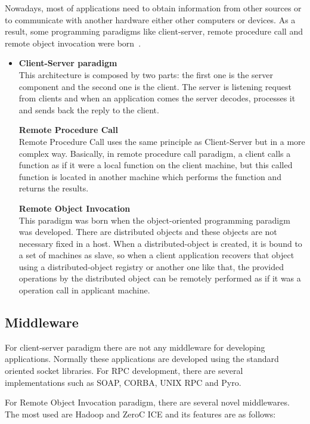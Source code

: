 Nowadays, most of applications need to obtain information from other sources
or to communicate with another hardware either other computers or
devices. As a
result, some programming paradigms like client-server, remote procedure call and
remote object invocation were born~\cite{Tanenbaum2008}.
\begin{itemize}
\item \textbf{Client-Server paradigm}~\\
This architecture is composed by two parts: the first one is the server
component and the second one is the client. The server is listening request from
clients and when an application comes the server decodes, processes it and
sends back the reply to the client.

\textbf{Remote Procedure Call}~\\
Remote Procedure Call uses the same principle as Client-Server but in a more
complex way. Basically, in remote procedure call paradigm, a client calls a
function as if it were a local function on the client machine, but this called
function is located in another machine which performs the function and returns
the results.

\textbf{Remote Object Invocation}~\\
This paradigm was born when the object-oriented programming paradigm was
developed. There are distributed objects and these objects are not
necessary fixed in a host. When a distributed-object is created, it is
bound to a set of machines as slave, so when a client application recovers that
object using a distributed-object registry or another one like that, the
provided operations by the distributed object can be remotely performed as if
it was a  operation call in applicant machine.
\end{itemize}

\subsection{Middleware}

For client-server paradigm there are not any middleware for developing
applications. Normally these applications are developed using the standard
oriented socket libraries.
For \ac{RPC} development, there are several implementations such as
\ac{SOAP}, \ac{CORBA}, UNIX \ac{RPC} and Pyro.

For Remote Object Invocation paradigm, there are several novel middlewares. The most used are
Hadoop and ZeroC \ac{ICE} and its features are as follows:

